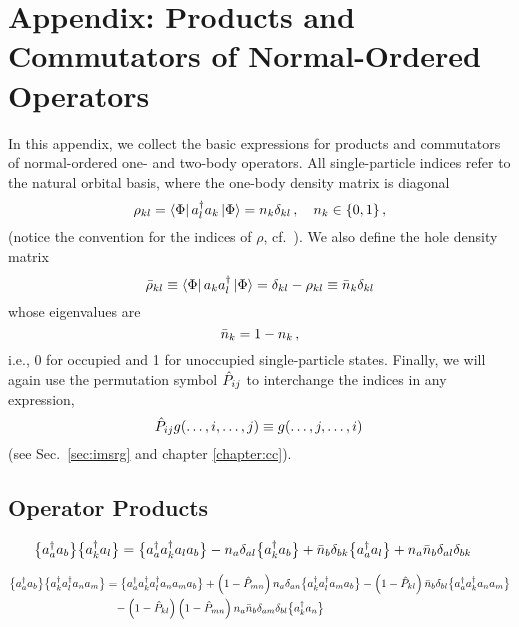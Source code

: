 {\section*{\label{app:products}Appendix: Products and Commutators of Normal-Ordered Operators}
In this appendix, we collect the basic expressions for products and commutators of
normal-ordered one- and two-body operators. All single-particle indices refer to 
the natural orbital basis, where the one-body density matrix is diagonal
\begin{equation}
  \rho_{kl} = \langle{\Phi}|\,{a^\dag_{l}a_{k}}\,|{\Phi}\rangle  = n_k \delta_{kl}\,,\quad n_k\in\{0,1\}\,,
\end{equation}
(notice the convention for the indices of $\rho$, cf.~\cite{Ring:1980bb}). We also
define the hole density matrix
\begin{equation}
  \bar\rho_{kl} \equiv \langle{\Phi}|\,{a_{k}a^\dag_{l}}\,|{\Phi}\rangle  = \delta_{kl} - \rho_{kl} \equiv \bar{n}_k\delta_{kl}
\end{equation}
whose eigenvalues are 
\begin{equation}
  \bar{n}_{k}  = 1 - n_{k}\,,
\end{equation}
i.e., 0 for occupied and 1 for unoccupied single-particle states. Finally, 
we will again use the permutation symbol $\hat{P}_{ij}$ to interchange the indices 
in any expression, 
\begin{equation}
  \hat{P}_{ij} g(\ldots,i,\ldots,j) \equiv g(\ldots,j,\ldots,i)\,
\end{equation}
(see Sec.~\ref{sec:imsrg} and chapter \ref{chapter:cc}).

\subsection*{Operator Products}
\begin{align}
  \big\{a^\dag_{a}a_{b}\big\}\big\{a^\dag_{k}a_{l}\big\}
  &=\big\{a^\dag_{a}a^\dag_{k}a_{l}a_{b}\big\}
    -n_a\delta_{al}\big\{a^\dag_{k}a_{b}\big\}
    +\bar{n}_b\delta_{bk}\big\{a^\dag_{a}a_{l}\big\}
    +n_a\bar{n}_b\delta_{al}\delta_{bk}
\end{align}



\begin{align}
  \big\{a^\dag_{a}a_{b}\big\}\big\{a^\dag_{k}a^\dag_{l}a_{n}a_{m}\big\}
  &=\big\{a^\dag_{a}a^\dag_{k}a^\dag_{l}a_{n}a_{m}a_{b}\big\}
    +\left(1-\hat{P}_{mn}\right)n_a\delta_{an}\big\{a^\dag_{k}a^\dag_{l}a_{m}a_{b}\big\}
    -\left(1-\hat{P}_{kl}\right)\bar{n}_b\delta_{bl}\big\{a^\dag_{a}a^\dag_{k}a_{n}a_{m}\big\}\notag\\
  &\hphantom{=}  
    -\left(1-\hat{P}_{kl}\right)\left(1-\hat{P}_{mn}\right)n_{a}\bar{n}_{b}\delta_{am}\delta_{bl}\big\{a^\dag_{k}a_{n}\big\}
\end{align}



}
